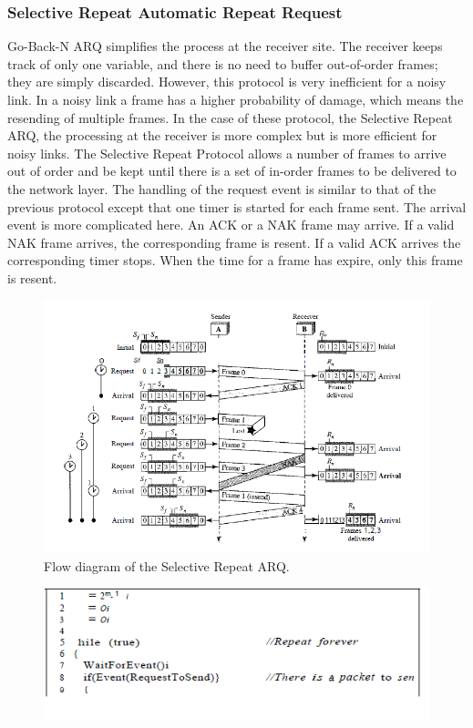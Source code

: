 \subsubsection{Selective Repeat Automatic Repeat Request}
Go-Back-N ARQ simplifies the process at the receiver site. The receiver keeps track of only one variable, and there is no need to buffer out-of-order frames; they are simply discarded. However, this protocol is very inefficient for a noisy link. In a noisy link a frame has a higher probability of damage, which means the resending of multiple frames. In the case of these protocol, the Selective Repeat ARQ, the processing at the receiver is more complex but is more efficient for noisy links. The Selective Repeat Protocol allows a number of frames to arrive out of order and be kept until there is a set of in-order frames to be delivered to the network layer. The handling of the request event is similar to that of the previous protocol except that one timer is started for each frame sent. The arrival event is more complicated here. An ACK or a NAK frame may arrive. If a valid NAK frame arrives, the corresponding frame is resent. If a valid ACK arrives the corresponding timer stops. When the time for a frame has expire, only this frame is resent.

\begin{figure}[H]
\begin{center}
\includegraphics[scale=0.8]{flowselective.PNG}  
\caption{Flow diagram of the Selective Repeat ARQ.}
\end{center}
\end{figure}

\begin{figure}[H]
\begin{center}
\includegraphics[scale=0.8]{senderselective1.PNG}
\end{center} 
\end{figure}

